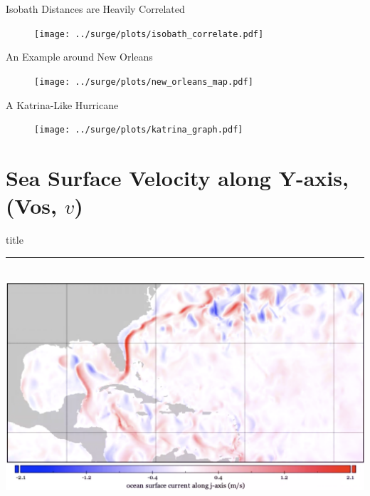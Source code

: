 \documentclass[usenames, dvipsnames]{beamer}
\begin{document}
\begin{frame}{Isobath Distances are Heavily Correlated}
\vspace{-30pt}
\hspace{-30pt}
\begin{figure}[htb!]
    \centering
    \hspace{-35pt}\texttt{[image: ../surge/plots/isobath\_correlate.pdf]}
\end{figure}
\end{frame}

\begin{frame}{An Example around New Orleans}
\vspace{-30pt}
\begin{figure}[htb!]
    \centering
    \texttt{[image: ../surge/plots/new\_orleans\_map.pdf]}
\end{figure}
\end{frame}

\begin{frame}{A Katrina-Like Hurricane}
\vspace{-30pt}
\begin{figure}[htb!]
    \centering
    \texttt{[image: ../surge/plots/katrina\_graph.pdf]}
\end{figure}
\end{frame}

\section{Sea Surface Velocity along Y-axis, (Vos, $v$) }
    \begin{frame}[plain]
        \vfill
      \centering
      \begin{beamercolorbox}[sep=8pt,center,shadow=true,rounded=true]{title}
        \insertsectionhead\par%
        \color{oxfordblue}\noindent\rule{10cm}{1pt} \\
        \includegraphics[width=0.93\linewidth]{images/example-images/vos.png}
      \end{beamercolorbox}
      \vfill
  \end{frame}
\end{document}
